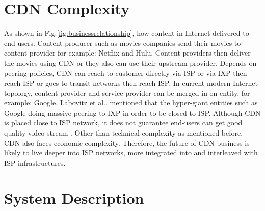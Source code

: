 \documentclass[paper]{ieice}
\begin{document}
\section{CDN Complexity}
As shown in Fig.\ref{fig:businessrelationship}, how content in Internet delivered to end-users.  
Content producer such as movies companies send their movies to content provider for example: Netflix and Hulu.
Content providers then deliver the movies using CDN or they also can use their upstream provider.
Depends on peering policies, CDN can reach to customer directly via ISP or via IXP then reach ISP or goes to transit networks then reach ISP.   
In current modern Internet topology, content provider and service provider can be merged in on entity, for example: Google.
Labovitz et al.,\cite{Labovitz:2010:IIT:2043164.1851194} mentioned that the hyper-giant entities such as Google doing massive peering to IXP in order to be closed to ISP. 
Although CDN is placed close to ISP network, it does not guarantee end-users can get good quality video stream \cite{Krishnan:2009:MBE:1644893.1644917}.
Other than technical complexity as mentioned before, CDN also faces economic complexity\cite{dispute}.
Therefore, the future of CDN business is likely to live deeper into ISP networks, more integrated into and interleaved with ISP infrastructures.




\section{System Description}\label{description}
\end{document}
